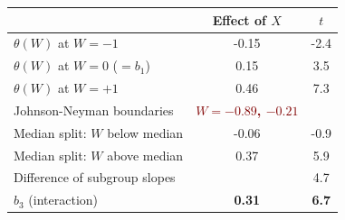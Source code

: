 \begin{tabular}{@{}lcc@{}}
\toprule
 & Effect of $X$ & $t$ \\
\midrule
$\theta(W)$ at $W = -1$ & -0.15 & -2.4 \\
$\theta(W)$ at $W = 0$ ($= b_1$) & 0.15 & 3.5 \\
$\theta(W)$ at $W = +1$ & 0.46 & 7.3 \\
Johnson-Neyman boundaries & \textcolor{Maroon}{\bfseries $W = -0.89$, $-0.21$} & \\
\midrule
Median split: $W$ below median & -0.06 & -0.9 \\
Median split: $W$ above median & 0.37 & 5.9 \\
Difference of subgroup slopes & & 4.7 \\
$b_3$ (interaction) & \textcolor{DeepNavy}{\bfseries 0.31} & \textcolor{DeepNavy}{\bfseries 6.7} \\
\bottomrule
\end{tabular}
